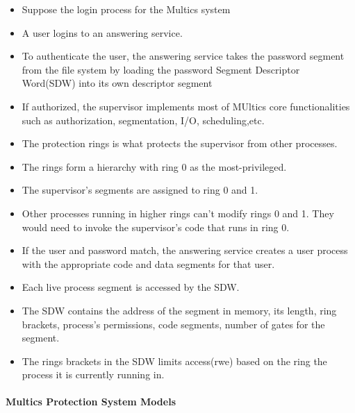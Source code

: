 \documentclass[
  12pt]{findlay}
\providecommand{\tightlist}{%
  \setlength{\itemsep}{0pt}\setlength{\parskip}{0pt}}
\begin{document}
\begin{itemize}
\tightlist
\item
  Suppose the login process for the Multics system
\item
  A user logins to an answering service.
\item
  To authenticate the user, the answering service takes the password
  segment from the file system by loading the password Segment
  Descriptor Word(SDW) into its own descriptor segment
\item
  If authorized, the supervisor implements most of MUltics core
  functionalities such as authorization, segmentation, I/O,
  scheduling,etc.
\item
  The protection rings is what protects the supervisor from other
  processes.
\item
  The rings form a hierarchy with ring 0 as the most-privileged.
\item
  The supervisor's segments are assigned to ring 0 and 1.
\item
  Other processes running in higher rings can't modify rings 0 and 1.
  They would need to invoke the supervisor's code that runs in ring 0.
\item
  If the user and password match, the answering service creates a user
  process with the appropriate code and data segments for that user.
\item
  Each live process segment is accessed by the SDW.
\item
  The SDW contains the address of the segment in memory, its length,
  ring brackets, process's permissions, code segments, number of gates
  for the segment.
\item
  The rings brackets in the SDW limits access(rwe) based on the ring the
  process it is currently running in.
\end{itemize}

\hypertarget{multics-protection-system-models}{%
\paragraph{Multics Protection System
Models}\label{multics-protection-system-models}}
\end{document}
